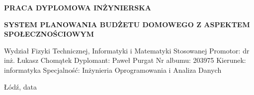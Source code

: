 \documentclass[a4paper,onecolumn,twoside,12pt]{mwrep}
\begin{document}
\lstset{
	language=csh,
	showstringspaces=false,	
	basicstyle=\footnotesize\ttfamily,
}
\setcounter{page}{1}
\pagestyle{plain}
\begin{titlepage}
	\begin{center}
		\textbf{PRACA DYPLOMOWA INŻYNIERSKA}
		\vspace*{1cm}
		
		\textbf{SYSTEM PLANOWANIA BUDŻETU DOMOWEGO Z ASPEKTEM SPOŁECZNOŚCIOWYM}
		
		\vspace{2cm}
		
		\vfill
		
		
		\vspace{0.8cm}
		
	\end{center}
	Wydział Fizyki Technicznej, Informatyki i Matematyki Stosowanej\newline
	Promotor: dr inż. Łukasz Chomątek\newline
	Dyplomant: Paweł Purgat\newline
	Nr albumu: 203975\newline
	Kierunek: informatyka\newline
	Specjalność: Inżynieria Oprogramowania i Analiza Danych
	\begin{center}
		Łódź, data
	\end{center}
		
\end{titlepage}


\tableofcontents









\listoffigures
\listoftables
\lstlistoflistings
\end{document}
